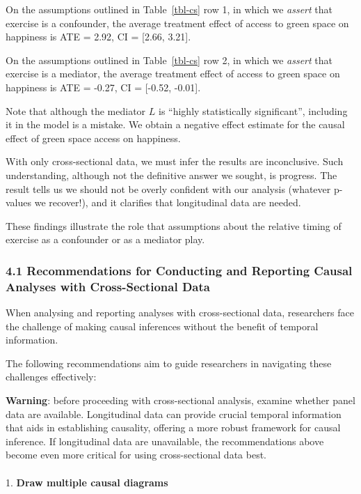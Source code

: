 \documentclass[
  single column]{article}
\makeatletter
\let\oldparagraph\paragraph
\renewcommand{\paragraph}{
    \@ifstar
      \xxxParagraphStar
      \xxxParagraphNoStar
  }
\newcommand{\xxxParagraphStar}[1]{\oldparagraph*{#1}\mbox{}}
\newcommand{\xxxParagraphNoStar}[1]{\oldparagraph{#1}\mbox{}}
\makeatother
\begin{document}
On the assumptions outlined in Table~\ref{tbl-cs} row 1, in which we
\emph{assert} that exercise is a confounder, the average treatment
effect of access to green space on happiness is ATE = 2.92, CI =
{[}2.66, 3.21{]}.

On the assumptions outlined in Table~\ref{tbl-cs} row 2, in which we
\emph{assert} that exercise is a mediator, the average treatment effect
of access to green space on happiness is ATE = -0.27, CI = {[}-0.52,
-0.01{]}.

Note that although the mediator \(L\) is ``highly statistically
significant'', including it in the model is a mistake. We obtain a
negative effect estimate for the causal effect of green space access on
happiness.

With only cross-sectional data, we must infer the results are
inconclusive. Such understanding, although not the definitive answer we
sought, is progress. The result tells us we should not be overly
confident with our analysis (whatever p-values we recover!), and it
clarifies that longitudinal data are needed.

These findings illustrate the role that assumptions about the relative
timing of exercise as a confounder or as a mediator play.

\subsubsection{4.1 Recommendations for Conducting and Reporting Causal
Analyses with Cross-Sectional
Data}\label{recommendations-for-conducting-and-reporting-causal-analyses-with-cross-sectional-data}

When analysing and reporting analyses with cross-sectional data,
researchers face the challenge of making causal inferences without the
benefit of temporal information.

The following recommendations aim to guide researchers in navigating
these challenges effectively:

\textbf{Warning}: before proceeding with cross-sectional analysis,
examine whether panel data are available. Longitudinal data can provide
crucial temporal information that aids in establishing causality,
offering a more robust framework for causal inference. If longitudinal
data are unavailable, the recommendations above become even more
critical for using cross-sectional data best.

\paragraph{\texorpdfstring{1. \textbf{Draw multiple causal
diagrams}}{1. Draw multiple causal diagrams}}\label{draw-multiple-causal-diagrams}
\end{document}
